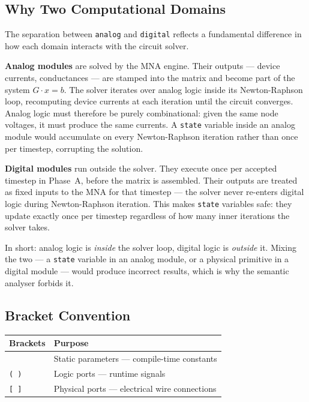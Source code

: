 \documentclass[11pt, a4paper]{article}
\newcommand{\code}[1]{\texttt{\small #1}}
\begin{document}
\subsection{Why Two Computational Domains}

The separation between \code{analog} and \code{digital} reflects a
fundamental difference in how each domain interacts with the circuit solver.

\textbf{Analog modules} are solved by the MNA engine. Their outputs ---
device currents, conductances --- are stamped into the matrix and become
part of the system $G \cdot x = b$. The solver iterates over analog logic
inside its Newton-Raphson loop, recomputing device currents at each
iteration until the circuit converges. Analog logic must therefore be
purely combinational: given the same node voltages, it must produce the
same currents. A \code{state} variable inside an analog module would
accumulate on every Newton-Raphson iteration rather than once per
timestep, corrupting the solution. 

\textbf{Digital modules} run outside the solver. They execute once per
accepted timestep in Phase~A, before the matrix is assembled. Their
outputs are treated as fixed inputs to the MNA for that timestep ---
the solver never re-enters digital logic during Newton-Raphson
iteration. This makes \code{state} variables safe: they update exactly
once per timestep regardless of how many inner iterations the solver
takes.

In short: analog logic is \textit{inside} the solver loop, digital logic
is \textit{outside} it. Mixing the two --- a \code{state} variable in an
analog module, or a physical primitive in a digital module --- would
produce incorrect results, which is why the semantic analyser forbids it.

\subsection{Bracket Convention}

\begin{center}
\begin{tabular}{@{} C{2cm} L{10cm} @{}}
  \toprule
  \textbf{Brackets} & \textbf{Purpose} \\
  \midrule
  \code{< >} & Static parameters — compile-time constants \\
  \code{( )} & Logic ports — runtime signals \\
  \code{[ ]} & Physical ports — electrical wire connections \\
  \bottomrule
\end{tabular}
\end{center}
\end{document}
